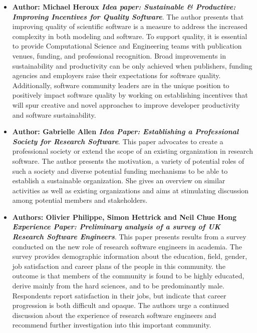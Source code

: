 \documentclass[11pt, oneside]{amsart}
\begin{document}
\begin{itemize}
\item \textbf{Author: Michael Heroux \emph{Idea paper: Sustainable & Productive: Improving Incentives for Quality Software}}.
The author presents that improving quality of scientific software is a measure  to address the increased complexity in both modeling and software. To support quality, it is essential to provide Computational Science and Engineering teams with publication venues, funding, and  professional recognition. Broad improvements in sustainability and productivity can be only achieved when publishers, funding  agencies  and  employers  raise  their  expectations for software quality. Additionally, software community leaders are in the unique position to positively impact software quality by working on establishing incentives that will spur creative and novel  approaches to improve developer productivity  and software sustainability.

\item \textbf{Author: Gabrielle Allen \emph{Idea Paper: Establishing a Professional Society for Research Software}}.
This paper advocates to create a professional society or extend the scope of an existing organization in research software. The author presents the motivation, a variety of potential roles of such a society and diverse potential funding mechanisms to be able to establish a sustainable organization. She gives an overview on similar activities as well as existing organizations and aims at stimulating discussion among potential members and stakeholders.

\item \textbf{Authors: Olivier Philippe, Simon Hettrick and Neil Chue Hong \emph{Experience Paper: Preliminary analysis of a survey of UK Research Software Engineers}}.
This paper presents results from a survey conducted on the new role of research software engineers in academia. The  survey  provides   demographic  information  about  the  education,  field,  gender,  job  satisfaction  and career  plans  of  the  people  in this community. the outcome is that members of the  community  is  found  to be highly educated, derive mainly from the hard sciences, and to be predominantly male. Respondents report satisfaction in their jobs,  but  indicate  that  career  progression  is  both  difficult  and opaque. The authors urge a  continued  discussion  about  the  experience  of research software engineers and  recommend further  investigation  into  this
important  community.


\end{itemize}
\end{document}
